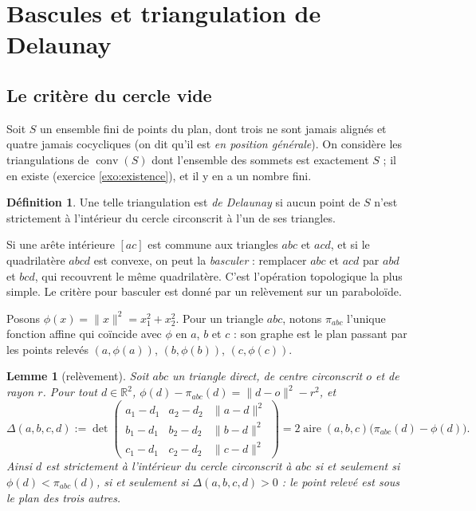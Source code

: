 \documentclass[11pt,a4paper]{article}
\theoremstyle{plain}
\newtheorem{lemme}[theoreme]{Lemme}
\theoremstyle{definition}
\newtheorem{definition}[theoreme]{Définition}
\theoremstyle{remark}
\newcommand{\R}{\mathbb{R}}
\DeclareMathOperator{\conv}{conv}
\DeclareMathOperator{\aire}{aire}
\begin{document}
\section{Bascules et triangulation de Delaunay}

\subsection{Le critère du cercle vide}

Soit $S$ un ensemble fini de points du plan, dont trois ne sont jamais alignés et quatre jamais cocycliques (on dit qu'il est \emph{en position générale}). On considère les triangulations de $\conv(S)$ dont l'ensemble des sommets est exactement $S$ ; il en existe (exercice \ref{exo:existence}), et il y en a un nombre fini.

\begin{definition}\label{def:delaunay}
Une telle triangulation est \emph{de Delaunay} si aucun point de $S$ n'est strictement à l'intérieur du cercle circonscrit à l'un de ses triangles.
\end{definition}

Si une arête intérieure $[ac]$ est commune aux triangles $abc$ et $acd$, et si le quadrilatère $abcd$ est convexe, on peut la \emph{basculer} : remplacer $abc$ et $acd$ par $abd$ et $bcd$, qui recouvrent le même quadrilatère. C'est l'opération topologique la plus simple. Le critère pour basculer est donné par un relèvement sur un paraboloïde.

Posons $\phi(x)=\|x\|^2=x_1^2+x_2^2$. Pour un triangle $abc$, notons $\pi_{abc}$ l'unique fonction affine qui coïncide avec $\phi$ en $a$, $b$ et $c$ : son graphe est le plan passant par les points relevés $(a,\phi(a))$, $(b,\phi(b))$, $(c,\phi(c))$.

\begin{lemme}[relèvement]\label{lem:relevement}
Soit $abc$ un triangle direct, de centre circonscrit $o$ et de rayon $r$. Pour tout $d\in\R^2$, $\phi(d)-\pi_{abc}(d)=\|d-o\|^2-r^2$, et
\[
  \Delta(a,b,c,d):=\det\begin{pmatrix}a_1-d_1&a_2-d_2&\|a-d\|^2\\ b_1-d_1&b_2-d_2&\|b-d\|^2\\ c_1-d_1&c_2-d_2&\|c-d\|^2\end{pmatrix}=2\aire(a,b,c)\big(\pi_{abc}(d)-\phi(d)\big).
\]
Ainsi $d$ est strictement à l'intérieur du cercle circonscrit à $abc$ si et seulement si $\phi(d)<\pi_{abc}(d)$, si et seulement si $\Delta(a,b,c,d)>0$ : le point relevé est sous le plan des trois autres.
\end{lemme}
\end{document}
